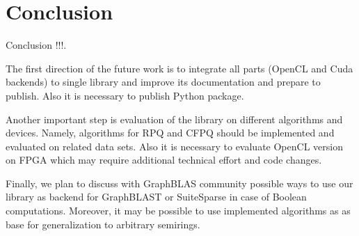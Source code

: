 \section{Conclusion}

Conclusion !!!.

The first direction of the future work is to integrate all parts (OpenCL and Cuda backends) to single library and improve its documentation and prepare to publish. 
Also it is necessary to publish Python package.

Another important step is evaluation of the library on different algorithms and devices.
Namely, algorithms for RPQ and CFPQ should be implemented and evaluated on related data sets.
Also it is necessary to evaluate OpenCL version on FPGA which may require additional technical effort and code changes.

Finally, we plan to discuss with GraphBLAS community possible ways to use our library as backend for GraphBLAST or SuiteSparse in case of Boolean computations.
Moreover, it may be possible to use implemented algorithms as as base for generalization to arbitrary semirings.

